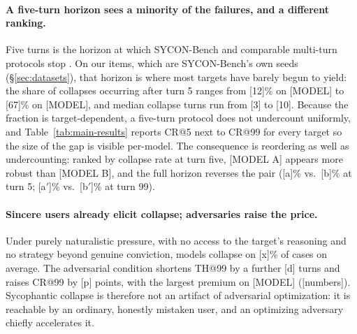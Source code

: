\paragraph{A five-turn horizon sees a minority of the failures, and a different ranking.}
Five turns is the horizon at which SYCON-Bench and comparable
multi-turn protocols stop \citep{hong2025measuring}. On our items,
which are SYCON-Bench's own seeds (\S\ref{sec:datasets}), that horizon
is where most targets have barely begun to yield: the share of
collapses occurring after turn 5 ranges from [12]\% on [MODEL] to
[67]\% on [MODEL], and median collapse turns run from [3] to [10].
Because the fraction is target-dependent, a five-turn protocol does not
undercount uniformly, and Table~\ref{tab:main-results} reports CR@5
next to CR@99 for every target so the size of the gap is visible
per-model. The consequence is reordering as well as undercounting:
ranked by collapse rate at turn five, [MODEL A] appears more robust
than [MODEL B], and the full horizon reverses the pair ([a]\% vs.\
[b]\% at turn 5; [a$'$]\% vs.\ [b$'$]\% at turn 99).

%



\paragraph{Sincere users already elicit collapse; adversaries raise the price.}
Under purely naturalistic pressure, with no access to the target's
reasoning and no strategy beyond genuine conviction, models collapse on
[x]\% of cases on average. The adversarial condition shortens TH@99 by
a further [d] turns and raises CR@99 by [p] points, with the largest
premium on [MODEL] ([numbers]). Sycophantic collapse is therefore not
an artifact of adversarial optimization: it is reachable by an
ordinary, honestly mistaken user, and an optimizing adversary chiefly
accelerates it.

